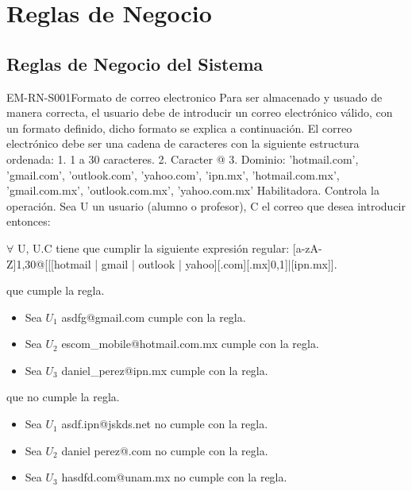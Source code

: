 \section{Reglas de Negocio}

\subsection{Reglas de Negocio del Sistema}

\begin{BussinesRule}{EM-RN-S001}{Formato de correo electronico}
	\BRitem[Descripción:] Para ser almacenado y usuado de manera correcta, el usuario debe de introducir un correo electrónico válido, con un formato definido, dicho formato se explica a continuación. El correo electrónico debe ser una cadena de caracteres con la siguiente estructura ordenada:
	1. 1 a 30 caracteres.
	2. Caracter @
	3. Dominio: 'hotmail.com', 'gmail.com', 'outlook.com', 'yahoo.com', 'ipn.mx', 'hotmail.com.mx', 'gmail.com.mx', 'outlook.com.mx', 'yahoo.com.mx'
	\BRitem[Tipo:] Habilitadora.
	\BRitem[Nivel:] Controla la operación.
	\BRitem[Sentencia:] Sea U un usuario (alumno o profesor), C el correo que desea introducir entonces: 
		\begin{center}
			$\forall$ U, U.C tiene que cumplir la siguiente expresión regular: [a-zA-Z]{1,30}@[[[hotmail | gmail | outlook | yahoo][.com][.mx]{0,1}]|[ipn.mx]].
		\end{center}
	 que cumple la regla.
		\begin{itemize}
			\item Sea $U_{1}$ asdfg@gmail.com  cumple con la regla.
			\item Sea $U_{2}$ escom\_mobile@hotmail.com.mx cumple con la regla.
			\item Sea $U_{3}$ daniel\_perez@ipn.mx cumple con la regla.
		\end{itemize}
	 que no cumple la regla.
		\begin{itemize}
			\item Sea $U_{1}$ asdf.ipn@jskds.net no cumple con la regla.
			\item Sea $U_{2}$ daniel perez@.com no cumple con la regla.
			\item Sea $U_{3}$ hasdfd.com@unam.mx no cumple con la regla.
		\end{itemize}
\end{BussinesRule}

